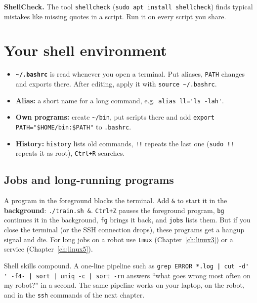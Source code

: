 \textbf{ShellCheck.} The tool \texttt{shellcheck} (\verb|sudo apt install shellcheck|) finds typical mistakes like missing quotes in a script. Run it on every script you share.

\section*{Your shell environment}
\begin{itemize}[nosep]
  \item \textbf{\texttt{\textasciitilde/.bashrc}} is read whenever you open a terminal. Put aliases, \texttt{PATH} changes and exports there. After editing, apply it with \verb|source ~/.bashrc|.
  \item \textbf{Alias:} a short name for a long command, e.g.\ \verb|alias ll='ls -lah'|.
  \item \textbf{Own programs:} create \texttt{\textasciitilde/bin}, put scripts there and add \verb|export PATH="$HOME/bin:$PATH"| to \texttt{.bashrc}.
  \item \textbf{History:} \verb|history| lists old commands, \verb|!!| repeats the last one (\verb|sudo !!| repeats it as root), \texttt{Ctrl+R} searches.
\end{itemize}

\subsection*{Jobs and long-running programs}
A program in the foreground blocks the terminal. Add \verb|&| to start it in the \textbf{background}: \verb|./train.sh &|. \texttt{Ctrl+Z} pauses the foreground program, \verb|bg| continues it in the background, \verb|fg| brings it back, and \verb|jobs| lists them. But if you close the terminal (or the SSH connection drops), these programs get a hangup signal and die. For long jobs on a robot use \texttt{tmux} (Chapter~\ref{ch:linux3}) or a service (Chapter~\ref{ch:linux5}).

\begin{aibox}
Shell skills compound. A one-line pipeline such as \verb/grep ERROR *.log | cut -d' ' -f4- | sort | uniq -c | sort -rn/ answers ``what goes wrong most often on my robot?'' in a second. The same pipeline works on your laptop, on the robot, and in the \texttt{ssh} commands of the next chapter.
\end{aibox}

